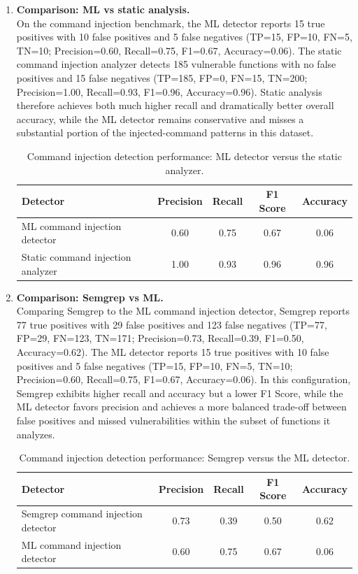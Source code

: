 \begin{enumerate}
  \item \textbf{Comparison: ML vs static analysis.}\\
  On the command injection benchmark, the ML detector reports 15 true positives with
  10 false positives and 5 false negatives (TP=15, FP=10, FN=5, TN=10; Precision=0.60,
  Recall=0.75, F1=0.67, Accuracy=0.06). The static command injection analyzer detects
  185 vulnerable functions with no false positives and 15 false negatives (TP=185, FP=0,
  FN=15, TN=200; Precision=1.00, Recall=0.93, F1=0.96, Accuracy=0.96). Static analysis
  therefore achieves both much higher recall and dramatically better overall accuracy,
  while the ML detector remains conservative and misses a substantial portion of the
  injected-command patterns in this dataset.

  \begin{table}[htbp]
    \centering
    \small
    \begin{tabular}{lcccc}
      \textbf{Detector} & \textbf{Precision} & \textbf{Recall} & \textbf{F1 Score} & \textbf{Accuracy} \\
      \hline
      ML command injection detector & 0.60 & 0.75 & 0.67 & 0.06 \\
      Static command injection analyzer & 1.00 & 0.93 & 0.96 & 0.96 \\
    \end{tabular}
    \caption{Command injection detection performance: ML detector versus the static analyzer.}
    \label{tab:cmd_ml_vs_static}
  \end{table}

  \item \textbf{Comparison: Semgrep vs ML.}\\
  Comparing Semgrep to the ML command injection detector, Semgrep reports 77 true
  positives with 29 false positives and 123 false negatives (TP=77, FP=29, FN=123,
  TN=171; Precision=0.73, Recall=0.39, F1=0.50, Accuracy=0.62). The ML detector reports
  15 true positives with 10 false positives and 5 false negatives (TP=15, FP=10, FN=5,
  TN=10; Precision=0.60, Recall=0.75, F1=0.67, Accuracy=0.06). In this configuration,
  Semgrep exhibits higher recall and accuracy but a lower F1 Score, while the ML detector
  favors precision and achieves a more balanced trade-off between false positives and
  missed vulnerabilities within the subset of functions it analyzes.

  \begin{table}[htbp]
    \centering
    \small
    \begin{tabular}{lcccc}
      \textbf{Detector} & \textbf{Precision} & \textbf{Recall} & \textbf{F1 Score} & \textbf{Accuracy} \\
      \hline
      Semgrep command injection detector & 0.73 & 0.39 & 0.50 & 0.62 \\
      ML command injection detector & 0.60 & 0.75 & 0.67 & 0.06 \\
    \end{tabular}
    \caption{Command injection detection performance: Semgrep versus the ML detector.}
    \label{tab:cmd_semgrep_vs_ml}
  \end{table}


\end{enumerate}

